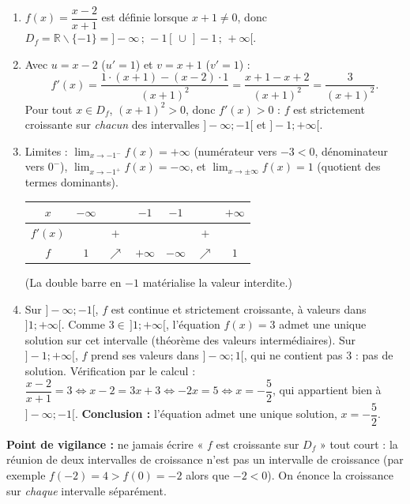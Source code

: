 \documentclass[11pt]{article}
\def\setminus{\mathbin{\backslash}}\let\smallsetminus\setminus
\begin{document}
\begin{corrige}
\begin{enumerate}
\item $f(x)=\dfrac{x-2}{x+1}$ est définie lorsque $x+1\neq 0$, donc $D_f=\mathbb{R}\setminus\{-1\}=]-\infty\,;\,-1[\,\cup\,]-1\,;\,+\infty[$.
\item Avec $u=x-2$ ($u'=1$) et $v=x+1$ ($v'=1$) :
\[ f'(x)=\frac{1\cdot(x+1)-(x-2)\cdot 1}{(x+1)^2}=\frac{x+1-x+2}{(x+1)^2}=\frac{3}{(x+1)^2}. \]
Pour tout $x\in D_f$, $(x+1)^2>0$, donc $f'(x)>0$ : $f$ est strictement croissante sur \emph{chacun} des intervalles $]-\infty;-1[$ et $]-1;+\infty[$.
\item Limites : $\lim_{x\to-1^-}f(x)=+\infty$ (numérateur vers $-3<0$, dénominateur vers $0^-$), $\lim_{x\to-1^+}f(x)=-\infty$, et $\lim_{x\to\pm\infty}f(x)=1$ (quotient des termes dominants).
\begin{center}
\begin{tabular}{|c|ccc||ccc|}
\hline
$x$ & $-\infty$ & & $-1$ & $-1$ & & $+\infty$ \\
\hline
$f'(x)$ & & $+$ & & & $+$ & \\
\hline
$f$ & $1$ & $\nearrow$ & $+\infty$ & $-\infty$ & $\nearrow$ & $1$ \\
\hline
\end{tabular}
\end{center}
(La double barre en $-1$ matérialise la valeur interdite.)
\item Sur $]-\infty;-1[$, $f$ est continue et strictement croissante, à valeurs dans $]1;+\infty[$. Comme $3\in\,]1;+\infty[$, l'équation $f(x)=3$ admet une unique solution sur cet intervalle (théorème des valeurs intermédiaires).
Sur $]-1;+\infty[$, $f$ prend ses valeurs dans $]-\infty;1[$, qui ne contient pas $3$ : pas de solution.
Vérification par le calcul : $\dfrac{x-2}{x+1}=3 \iff x-2=3x+3 \iff -2x=5 \iff x=-\dfrac{5}{2}$, qui appartient bien à $]-\infty;-1[$.
\textbf{Conclusion :} l'équation admet une unique solution, $x=-\dfrac{5}{2}$.
\end{enumerate}
\textbf{Point de vigilance :} ne jamais écrire « $f$ est croissante sur $D_f$ » tout court : la réunion de deux intervalles de croissance n'est pas un intervalle de croissance (par exemple $f(-2)=4>f(0)=-2$ alors que $-2<0$). On énonce la croissance sur \emph{chaque} intervalle séparément.
\end{corrige}
\end{document}
